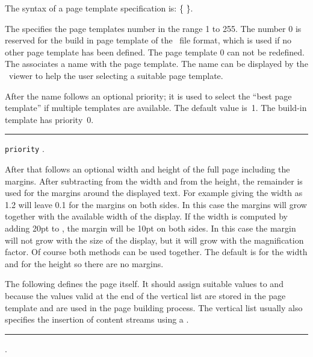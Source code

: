 The syntax of a page template specification is:
\medskip
\prim{}
 \opt{\.{=}}  
  
\.{\{} \.{\}}.
\medskip

The  specifies the page templates number in the range 1
to 255.  The number 0 is reserved for the build in page template of
the \HINT\ file format, which is used if no other page template has
been defined. The page template 0 can not be redefined.
The  associates a name with the page template.  The name can
be displayed by the \HINT\ viewer to help the user selecting a
suitable page template.

After the name follows an optional priority; it is used to select the
``best page template'' if multiple templates are available. The
default value is~1. The build-in template has priority~0.

\medskip
{}
\rule{}: {\tt priority} .
\medskip


After that follows an optional width and height of the full page
including the margins.  After subtracting  from the width
and  from the height, the remainder is used for the margins
around the displayed text.  For example giving the width as
1.2 will leave 0.1 for the margins on both sides.
In this case the margins will grow together with the available width
of the display.  If the width is computed by adding 20pt
to , the margin will be 10pt on both sides.  In this case
the margin will not grow with the size of the display, but it will
grow with the magnification factor.  Of course both methods can be
used together.  The default is  for the width and 
for the height so there are no margins.

The following  defines the page itself. It should assign suitable values
to  and  because the values valid at the end of the vertical list
are stored in the page template and are used in the page building process. 
The vertical list usually also specifies the insertion of content streams
using a .

\medskip
{}
\rule{}:
   .
\medskip

